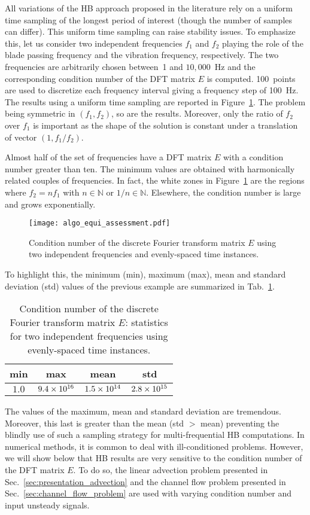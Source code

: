 All variations of the HB approach proposed in the literature rely on 
a uniform time sampling of the longest period of interest 
(though the number of samples can differ). 
This uniform time sampling can raise stability issues.
To emphasize this, let us consider two independent frequencies $f_1$
and $f_2$ playing the role of the blade passing frequency and
the vibration frequency, respectively. 
The two frequencies are arbitrarily chosen between~1
and $10,000$~Hz and the corresponding
condition number of the DFT matrix $E$ is computed. 
100~points are used to discretize each 
frequency interval giving a frequency step of 100~Hz.
The results using a uniform time
sampling are reported in Figure~\ref{fig:algo_equi_assessment}.
The problem being symmetric in $(f_1, f_2)$, so are the results.
Moreover, only the
ratio of $f_2$ over $f_1$ is important as the shape of the
solution is constant under a translation of vector $(1,f_1 / f_2)$.

Almost half of the set of frequencies have a DFT matrix $E$
with a condition number greater than ten.
The minimum values are obtained with harmonically related couples
of frequencies. In fact, the white zones in Figure~\ref{fig:algo_equi_assessment}
are the regions where $f_2 = n f_1$ with $n \in \mathbb{N}$ or $1/n \in \mathbb{N}$.
Elsewhere, the condition number is large and grows exponentially.
\begin{figure}[htp]
  \centering
  \texttt{[image: algo\_equi\_assessment.pdf]}
  \caption{Condition number of the discrete Fourier transform matrix $E$
  using two independent frequencies and evenly-spaced time instances.}
  \label{fig:algo_equi_assessment}
\end{figure}
To highlight this, the minimum (min), maximum (max), mean and 
standard deviation (std) values of the
previous example are summarized in Tab.~\ref{tab:hb_algo_equi}.
\begin{table}[htp]
  \centering
  \begin{tabular}{cccc}
    \toprule
    min & max & mean & std \\
    \midrule
    $1.0$ & $9.4\times 10^{16}$ & $1.5\times 10^{14}$ & $2.8\times 10^{15}$ \\
    \bottomrule
  \end{tabular}
  \caption{Condition number of the discrete Fourier transform matrix $E$: 
  statistics for two independent frequencies using evenly-spaced time instances.}
  \label{tab:hb_algo_equi}
\end{table}  
The values of the maximum, mean and standard deviation are tremendous.
Moreover, this last is greater than the mean
(std $ > $ mean) preventing the blindly use of such a sampling strategy for 
multi-frequential HB computations.
In numerical methods, it is common to deal with ill-conditioned
problems. However, we will show below that HB results are 
very sensitive to the condition number of the DFT matrix $E$.
To do so, the linear advection problem
presented in Sec.~\ref{sec:presentation_advection}
and the channel flow problem presented in 
Sec.~\ref{sec:channel_flow_problem}
are used with varying condition number and input unsteady signals.
